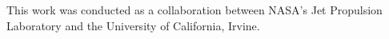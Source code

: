 \documentclass[tc, manuscript]{copernicus}
\begin{document}

\begin{acknowledgements}
    This work was conducted as a collaboration between NASA’s Jet Propulsion Laboratory and the University of California, Irvine. 
\end{acknowledgements}


\end{document}
